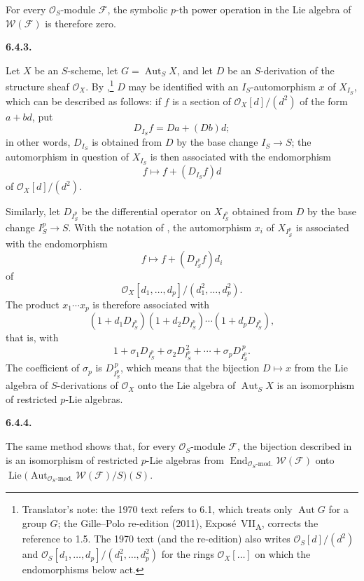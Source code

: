 For every \(\mathcal O_S\)-module \(\mathcal F\), the symbolic \(p\)-th
power operation in the Lie algebra of \(\mathcal W(\mathcal F)\) is
therefore zero.

\medskip
\noindent\textbf{6.4.3.}
\label{sga3:VIIA:6.4.3}

Let \(X\) be an \(S\)-scheme, let
\(G=\operatorname{Aut}_S X\), and let \(D\) be an
\(S\)-derivation of the structure sheaf \(\mathcal O_X\). By
,\footnote{Translator's note: the 1970 text refers to 6.1,
which treats only \(\operatorname{Aut}G\) for a group \(G\); the
Gille--Polo re-edition (2011), Expos\'e~VII\textsubscript{A}, corrects
the reference to 1.5. The 1970 text (and the re-edition) also writes
\(\mathcal O_S[d]/(d^2)\) and \(\mathcal O_S[d_1,\ldots,d_p]/(d_1^2,\ldots,d_p^2)\)
for the rings \(\mathcal O_X[\ldots]\) on which the endomorphisms below
act.} \(D\) may be identified with an \(I_S\)-automorphism \(x\)
of \(X_{I_S}\), which can be described as follows: if \(f\) is a
section of \(\mathcal O_X[d]/(d^2)\) of the form \(a+bd\), put
\[
  D_{I_S}f=Da+(Db)d;
\]
in other words, \(D_{I_S}\) is obtained from \(D\) by the base change
\(I_S\to S\); the automorphism in question of \(X_{I_S}\) is then
associated with the endomorphism
\[
  f\longmapsto f+(D_{I_S}f)d
\]
of \(\mathcal O_X[d]/(d^2)\).

Similarly, let \(D_{I_S^p}\) be the differential operator on
\(X_{I_S^p}\) obtained from \(D\) by the base change
\(I_S^p\to S\). With the notation of , the automorphism
\(x_i\) of \(X_{I_S^p}\) is associated with the endomorphism
\[
  f\longmapsto f+(D_{I_S^p}f)d_i
\]
of
\[
  \mathcal O_X[d_1,\ldots,d_p]/(d_1^2,\ldots,d_p^2).
\]
The product \(x_1\cdots x_p\) is therefore associated with
\[
  (1+d_1D_{I_S^p})(1+d_2D_{I_S^p})\cdots
  (1+d_pD_{I_S^p}),
\]
that is, with
\[
  1+\sigma_1D_{I_S^p}
  +\sigma_2D_{I_S^p}^{\,2}
  +\cdots+
  \sigma_pD_{I_S^p}^{\,p}.
\]
The coefficient of \(\sigma_p\) is \(D_{I_S^p}^{\,p}\), which means
that the bijection \(D\mapsto x\) from the Lie algebra of
\(S\)-derivations of \(\mathcal O_X\) onto the Lie algebra of
\(\operatorname{Aut}_S X\) is an isomorphism of restricted \(p\)-Lie
algebras.

\medskip
\noindent\textbf{6.4.4.}
\label{sga3:VIIA:6.4.4}

The same method shows that, for every \(\mathcal O_S\)-module
\(\mathcal F\), the bijection described in  is an isomorphism of
restricted \(p\)-Lie algebras from
\(\operatorname{End}_{\mathcal O_S\text{-mod.}}\mathcal W(\mathcal F)\)
onto
\(\operatorname{Lie}\bigl(\operatorname{Aut}_{\mathcal O_S\text{-mod.}}
\mathcal W(\mathcal F)/S\bigr)(S)\).

